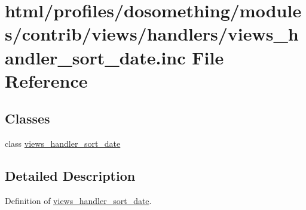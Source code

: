\hypertarget{views__handler__sort__date_8inc}{
\section{html/profiles/dosomething/modules/contrib/views/handlers/views\_\-handler\_\-sort\_\-date.inc File Reference}
\label{views__handler__sort__date_8inc}
}
\subsection*{Classes}
\begin{DoxyCompactItemize}
\item 
class \hyperlink{classviews__handler__sort__date}{views\_\-handler\_\-sort\_\-date}
\end{DoxyCompactItemize}


\subsection{Detailed Description}
Definition of \hyperlink{classviews__handler__sort__date}{views\_\-handler\_\-sort\_\-date}. 